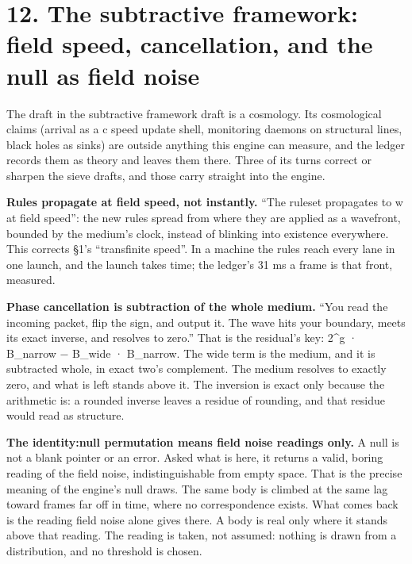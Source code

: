 \section{\texorpdfstring{12. The subtractive framework: field speed, cancellation, and the null as field noise}{12. The subtractive framework: field speed, cancellation, and the null as field noise}}

The draft in the subtractive framework draft is a cosmology. Its cosmological claims (arrival as a c speed update shell, monitoring daemons on structural lines, black holes as sinks) are outside anything this engine can measure, and the ledger records them as theory and leaves them there. Three of its turns correct or sharpen the sieve drafts, and those carry straight into the engine.

\textbf{Rules propagate at field speed, not instantly.} “The ruleset propagates to w at field speed”: the new rules spread from where they are applied as a wavefront, bounded by the medium's clock, instead of blinking into existence everywhere. This corrects §1's “transfinite speed”. In a machine the rules reach every lane in one launch, and the launch takes time; the ledger's 31 ms a frame is that front, measured.

\textbf{Phase cancellation is subtraction of the whole medium.} “You read the incoming packet, flip the sign, and output it. The wave hits your boundary, meets its exact inverse, and resolves to zero.” That is the residual's key: 2\textasciicircum{}g · B\_\allowbreak{}narrow − B\_\allowbreak{}wide · B\_\allowbreak{}narrow. The wide term is the medium, and it is subtracted whole, in exact two's complement. The medium resolves to exactly zero, and what is left stands above it. The inversion is exact only because the arithmetic is: a rounded inverse leaves a residue of rounding, and that residue would read as structure.

\textbf{The identity:null permutation means field noise readings only.} A null is not a blank pointer or an error. Asked what is here, it returns a valid, boring reading of the field noise, indistinguishable from empty space. That is the precise meaning of the engine's null draws. The same body is climbed at the same lag toward frames far off in time, where no correspondence exists. What comes back is the reading field noise alone gives there. A body is real only where it stands above that reading. The reading is taken, not assumed: nothing is drawn from a distribution, and no threshold is chosen.

